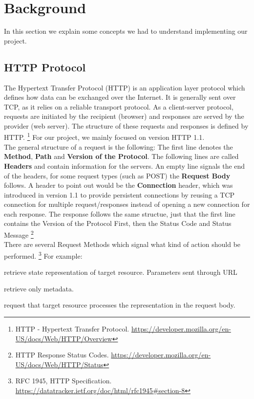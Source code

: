 \section*{Background}
In this section we explain some concepts we had to understand implementing our project. 

\subsection*{HTTP Protocol}
The Hypertext Transfer Protocol (HTTP) is an application layer protocol which defines how data can be exchanged over the Internet. It is generally sent over TCP, as it relies on a reliable transport protocol. 
As a client-server protocol, requests are initiated by the recipient (browser) and responses are served by the provider (web server). The structure of these requests and responses is defined by HTTP. \footnote{HTTP - Hypertext Transfer Protocol. \url{https://developer.mozilla.org/en-US/docs/Web/HTTP/Overview}} For our project, we mainly focused on version HTTP 1.1. \\

The general structure of a request is the following: The first line denotes the \textbf{Method}, \textbf{Path} and \textbf{Version of the Protocol}. The following lines are called \textbf{Headers} and contain information for the servers. An empty line signals the end of the headers, for some request types (such as POST) the \textbf{Request Body} follows. A header to point out would be the \textbf{Connection} header, which was introduced in version 1.1 to provide persistent connections by reusing a TCP connection for multiple request/responses instead of opening a new connection for each response. The response follows the same structue, just that the first line contains the Version of the Protocol First, then the Status Code and Status Message \footnote{HTTP Response Status Codes. \url{https://developer.mozilla.org/en-US/docs/Web/HTTP/Status}} \\

There are several Request Methods which signal what kind of action should be performed. \footnote{RFC 1945, HTTP Specification. \url{https://datatracker.ietf.org/doc/html/rfc1945\#section-8}} For example: 
\begin{description}[noitemsep, topsep=1pt,leftmargin=*]
    \item[GET]retrieve state representation of target resource. Parameters sent through URL 
    \item[HEAD]retrieve only metadata. 
    \item[POST]request that target resource processes the representation in the request body. 
\end{description}

